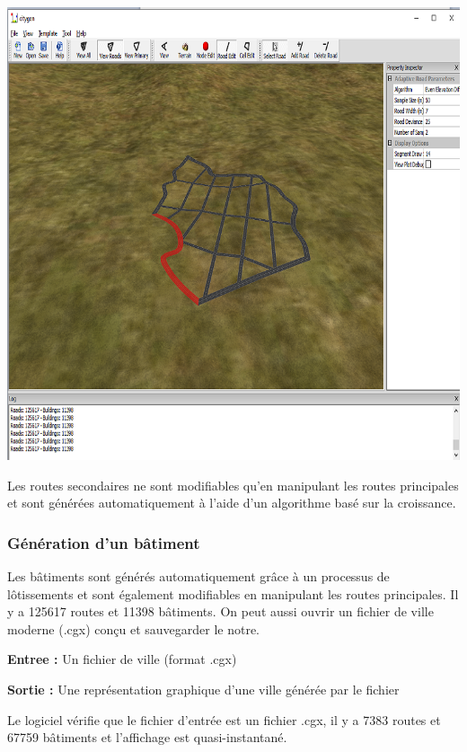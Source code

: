 \begin{center}
\includegraphics[height = 5 cm]{images/figure3.png}\\
\end{center}
Les routes secondaires ne sont modifiables qu'en manipulant les routes principales et sont générées automatiquement à l'aide d'un algorithme basé sur la croissance.

\subsubsection{\textbf{Génération d'un bâtiment}}

Les bâtiments sont générés automatiquement grâce à un processus de lôtissements et sont également modifiables en manipulant les routes principales.
Il y a 125617 routes et 11398 bâtiments.
\newline
On peut aussi ouvrir un fichier de ville moderne (.cgx) conçu et sauvegarder le notre.

\textbf{\tab Entree : } Un fichier de ville (format .cgx)

\textbf{\tab Sortie : } Une représentation graphique d'une ville générée par le fichier
    
    
    \tab Le logiciel vérifie que le fichier d'entrée est un fichier .cgx, il y a 7383 routes et 67759 bâtiments et l'affichage est quasi-instantané.

